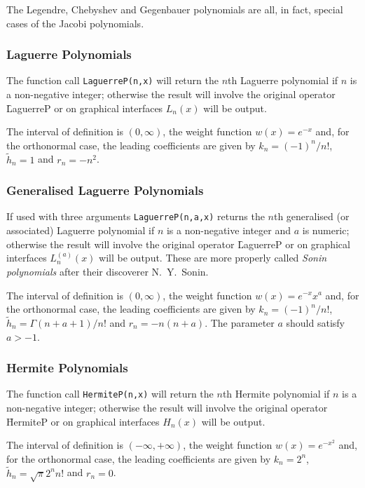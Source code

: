 The Legendre, Chebyshev and Gegenbauer polynomials are all, in fact, special
cases of the Jacobi polynomials.

\subsubsection{Laguerre Polynomials}
\hypertarget{operator:LAGUERREP}{}
The function call \texttt{LaguerreP(n,x)} will return the $n$th Laguerre
polynomial if $n$ is a non-negative integer; otherwise the result will involve
the original operator \f{LaguerreP} or on graphical interfaces $L_n(x)$
will be output.

The interval of definition is $(0, \infty)$, the weight function
$w(x)=e^{-x}$ and, for the orthonormal case, the leading coefficients
are given by $k_n=(-1)^n/n!$, $\tilde{h}_n =1$ and $r_n = -n^2$.

\subsubsection{Generalised Laguerre Polynomials}
If used with three arguments \texttt{LaguerreP(n,a,x)} returns the $n$th
generalised (or associated) Laguerre polynomial if $n$ is a non-negative
integer and $a$ is numeric; otherwise the result will involve the original
operator \f{LaguerreP} or on graphical interfaces $L_n^{(a)}(x)$ will be
output. These are more properly called \emph{Sonin polynomials} after their
discoverer N.~Y.~Sonin.

The interval of definition is $(0, \infty)$, the weight function
$w(x)=e^{-x}x^a$ and, for the orthonormal case, the leading coefficients
are given by $k_n=(-1)^n/n!$, $\tilde{h}_n = \Gamma(n+a+1)/n!$ and
$r_n=-n(n+a)$. The parameter $a$ should satisfy $a > -1$.

\subsubsection{Hermite Polynomials}
\hypertarget{operator:HERMITEP}{}
The function call \texttt{HermiteP(n,x)} will return the $n$th Hermite
polynomial if $n$ is a non-negative integer; otherwise the result will involve
the original operator \f{HermiteP} or on graphical interfaces $H_n(x)$
will be output.

The interval of definition is $(-\infty, +\infty)$, the weight function
$w(x)=e^{-x^2}$ and,
for the orthonormal case, the leading coefficients are given by
$k_n=2^n$, $\tilde{h}_n = \sqrt{\pi}2^nn!$ and $r_n=0$.

